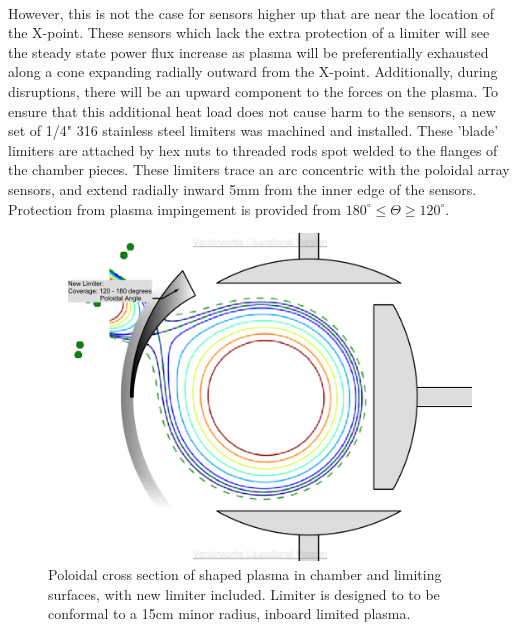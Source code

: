 \paragraph{}However, this is not the case for sensors higher up that are near the location of the X-point.  These sensors which lack the extra protection of a limiter will see the steady state power flux increase as plasma will be preferentially exhausted along a cone expanding radially outward from the X-point.  Additionally, during disruptions, there will be an upward component to the forces on the plasma.  To ensure that this additional heat load does not cause harm to the sensors, a new set of 1/4" 316 stainless steel limiters was machined and installed.  These 'blade' limiters are attached by hex nuts to threaded rods spot welded to the flanges of the chamber pieces.  These limiters trace an arc concentric with the poloidal array sensors, and extend radially inward 5mm from the inner edge of the sensors.  Protection from plasma impingement is provided from $180^{\circ} \leq \Theta \geq 120^{\circ}$.

\begin{figure}
\includegraphics[width = \textwidth]{./figures/Poloidal_Cross_Section_shaping_plus_new_limter_v2013.pdf}\begin{flushleft}
\caption{Poloidal cross section of shaped plasma in chamber and limiting surfaces, with new limiter included.  Limiter is designed to to be conformal to a 15cm minor radius, inboard limited plasma.}
\end{flushleft}
\label{new_limiters}
\end{figure}

